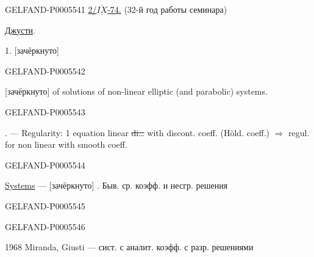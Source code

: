 \begin{GelfandAdjacentEvidence}{GELFAND-P000554}{1}
\uline{2/\mbox{$\overline{\underline{IX}}$}-74.}\qquad
{}\quad (32-й год работы семинара)

\uline{Джусти}.

1.  [зачёркнуто] 
\end{GelfandAdjacentEvidence}
\begin{GelfandAdjacentEvidence}{GELFAND-P000554}{2}

[зачёркнуто] of solutions of non-linear elliptic (and parabolic) systems.
\end{GelfandAdjacentEvidence}
\begin{GelfandAdjacentEvidence}{GELFAND-P000554}{3}

. — Regularity: 1 equation linear
\sout{di\ldots} with discont. coeff. (Höld. coeff.)
\(\Rightarrow\) regul. for non linear with smooth coeff.
\end{GelfandAdjacentEvidence}
\begin{GelfandAdjacentEvidence}{GELFAND-P000554}{4}

\uline{Systems} — [зачёркнуто] . Быв. ср. коэфф. и несгр. решения
\end{GelfandAdjacentEvidence}
\begin{GelfandAdjacentEvidence}{GELFAND-P000554}{5}

\end{GelfandAdjacentEvidence}
\begin{GelfandAdjacentEvidence}{GELFAND-P000554}{6}

1968 Miranda, Giusti — сист. с аналит. коэфф. с разр. решениями
\end{GelfandAdjacentEvidence}
